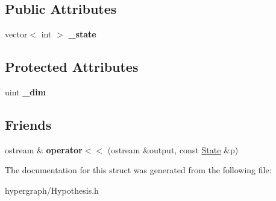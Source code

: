 \subsection*{Public Attributes}
\begin{DoxyCompactItemize}
\item 
\hypertarget{structScarab_1_1HG_1_1State_a1c516b546a5e3de3a5f9bb8f39a3cf20}{
vector$<$ int $>$ {\bfseries \_\-state}}
\label{structScarab_1_1HG_1_1State_a1c516b546a5e3de3a5f9bb8f39a3cf20}

\end{DoxyCompactItemize}
\subsection*{Protected Attributes}
\begin{DoxyCompactItemize}
\item 
\hypertarget{structScarab_1_1HG_1_1State_ae3d755b161845bd295deae4096d4c9f8}{
uint {\bfseries \_\-dim}}
\label{structScarab_1_1HG_1_1State_ae3d755b161845bd295deae4096d4c9f8}

\end{DoxyCompactItemize}
\subsection*{Friends}
\begin{DoxyCompactItemize}
\item 
\hypertarget{structScarab_1_1HG_1_1State_a353ffb342165fcaec0e812d0288fc329}{
ostream \& {\bfseries operator$<$$<$} (ostream \&output, const \hyperlink{structScarab_1_1HG_1_1State}{State} \&p)}
\label{structScarab_1_1HG_1_1State_a353ffb342165fcaec0e812d0288fc329}

\end{DoxyCompactItemize}


The documentation for this struct was generated from the following file:\begin{DoxyCompactItemize}
\item 
hypergraph/Hypothesis.h\end{DoxyCompactItemize}
